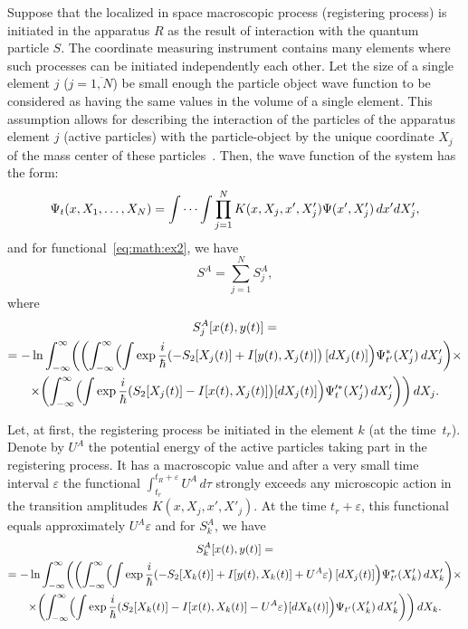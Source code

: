\smallskip 
  
\hypertarget{sama:l1}{}
  
Suppose that the localized in space macroscopic process (registering process) is initiated in the apparatus $R$ as the result of interaction with the quantum particle $S$. 
The coordinate measuring instrument contains many elements where such processes can be initiated independently each other. 
Let the size of a single element $j$ ($j=\overline{1,N}$) be small enough the particle object wave function to be considered as having the same values in the volume of a single element. 
This assumption allows for describing the interaction of the particles of the apparatus element $j$ (active particles) with the particle-object by the unique coordinate $X_j$ of the mass center of these particles~\cite{bib:13,bib:14}. 
Then, the wave function of the system has the form:
\begin{equation*}
 \Psi_t(x,X_1,\dots ,X_N)=\idotsint\prod\limits_{j=1}^{N}K(x,X_j,x',X'_j)\Psi(x',X'_j)\,dx'dX'_j,
\end{equation*}
and for functional~\eqref{eq:math:ex2}, we have
\begin{equation*}
 S^A=\sum\limits_{j=1}^{N}S^A_j,
\end{equation*} 
where {\small
\begin{multline*}
 S_j^A[x(t),y(t)]=
 \\
 ={-}\ln\int _{-\infty}^{\infty}\biggl(\biggl(\int _{-\infty}^{\infty}\Bigl(\int\exp\frac{i}{\hbar}
 ({-}S_2[X_j(t)]+I[y(t),X_j(t)]\bigr)\,[dX_j(t)]\Bigr)\Psi_{t'}^*(X'_j)\,dX'_j\biggr)\times
 \\
 \times\biggl(\int _{-\infty}^{\infty}\Bigl(\int\exp\frac{i}{\hbar}(S_2[X_j(t)]-I[x(t),X_j(t)]\bigr)[dX_j(t)]\Bigr)\Psi_{t}'^*(X'_j)\,dX'_j\biggr)\biggr)\,dX_j.
\end{multline*}
}


 Let, at first, the registering process be initiated in the element $k$ (at the time~$t_r$). 
 Denote by $U^A$ the potential energy of the active particles taking part in the registering process. It has a macroscopic value and after a very small time interval $\varepsilon$ the functional 
$\displaystyle \int _{t_r}^{t_R+\varepsilon}U^A\,d\tau$ strongly exceeds any microscopic action in the transition amplitudes $K(x,X_j,x',X'_j)$. At the time $t_r+\varepsilon$, this functional equals approximately $U^A\varepsilon$ and for $S^A_k$, we have {\small
\begin{multline*}
 S_k^A[x(t),y(t)]=
 \\=-\ln\int _{-\infty}^{\infty}\biggl(\biggl(\int _{-\infty}^{\infty}\Bigl(\int\exp\frac{i}{\hbar}(-S_2[X_k(t)]+I[y(t),X_k(t)]+U^A\varepsilon\bigr)\,[dX_j(t)]\Bigr)\Psi_{t'}^*(X'_k)\,dX'_k\biggr)\times
 \\
 \times\biggl(\int _{-\infty}^{\infty}\Bigl(\int\exp\frac{i}{\hbar}(S_2[X_k(t)]-I[x(t),X_k(t)]-U^A\varepsilon\bigr)[dX_k(t)]\Bigr)\Psi_{t'}(X'_k)\,dX'_k\biggr)\biggr)\,dX_k.
\end{multline*} }

